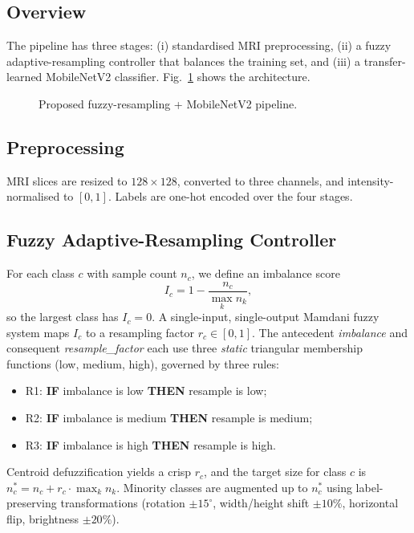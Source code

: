 \documentclass[journal]{IEEEtran}
\begin{document}
\subsection{Overview}
The pipeline has three stages: (i) standardised MRI preprocessing, (ii) a fuzzy
adaptive-resampling controller that balances the training set, and (iii) a
transfer-learned MobileNetV2 classifier. Fig.~\ref{fig:arch} shows the
architecture.%
\begin{figure}[t]
  \centering
  \caption{Proposed fuzzy-resampling + MobileNetV2 pipeline.}
  \label{fig:arch}
\end{figure}

\subsection{Preprocessing}
MRI slices are resized to $128\times128$, converted to three channels, and
intensity-normalised to $[0,1]$. Labels are one-hot encoded over the four stages.

\subsection{Fuzzy Adaptive-Resampling Controller}
For each class $c$ with sample count $n_c$, we define an imbalance score
\begin{equation}
  I_c = 1 - \frac{n_c}{\max_k n_k},
\end{equation}
so the largest class has $I_c = 0$. A single-input, single-output Mamdani fuzzy
system maps $I_c$ to a resampling factor $r_c \in [0,1]$. The antecedent
\textit{imbalance} and consequent \textit{resample\_factor} each use three
\emph{static} triangular membership functions (low, medium, high), governed by
three rules:
\begin{itemize}
  \item R1: \textbf{IF} imbalance is low \textbf{THEN} resample is low;
  \item R2: \textbf{IF} imbalance is medium \textbf{THEN} resample is medium;
  \item R3: \textbf{IF} imbalance is high \textbf{THEN} resample is high.
\end{itemize}
Centroid defuzzification yields a crisp $r_c$, and the target size for class $c$
is $n_c^{\ast} = n_c + r_c \cdot \max_k n_k$. Minority classes are augmented up to
$n_c^{\ast}$ using label-preserving transformations (rotation $\pm15^\circ$,
width/height shift $\pm10\%$, horizontal flip, brightness $\pm20\%$).
\end{document}
